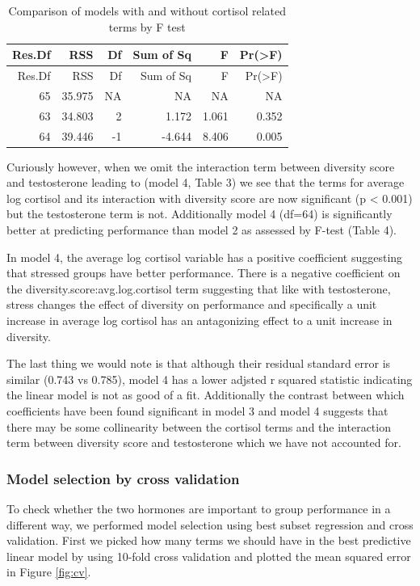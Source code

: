 \documentclass[]{article}
\begin{document}
\begin{longtable}[]{@{}rrrrrr@{}}
\caption{Comparison of models with and without cortisol related terms by
F test}\tabularnewline
\toprule
Res.Df & RSS & Df & Sum of Sq & F & Pr(\textgreater{}F)\tabularnewline
\midrule
\endfirsthead
\toprule
Res.Df & RSS & Df & Sum of Sq & F & Pr(\textgreater{}F)\tabularnewline
\midrule
\endhead
65 & 35.975 & NA & NA & NA & NA\tabularnewline
63 & 34.803 & 2 & 1.172 & 1.061 & 0.352\tabularnewline
64 & 39.446 & -1 & -4.644 & 8.406 & 0.005\tabularnewline
\bottomrule
\end{longtable}

Curiously however, when we omit the interaction term between diversity
score and testosterone leading to (model 4, Table 3) we see that the
terms for average log cortisol and its interaction with diversity score
are now significant (p \textless{} 0.001) but the testosterone term is
not. Additionally model 4 (df=64) is significantly better at predicting
performance than model 2 as assessed by F-test (Table 4).

In model 4, the average log cortisol variable has a positive coefficient
suggesting that stressed groups have better performance. There is a
negative coefficient on the diversity.score:avg.log.cortisol term
suggesting that like with testosterone, stress changes the effect of
diversity on performance and specifically a unit increase in average log
cortisol has an antagonizing effect to a unit increase in diversity.

The last thing we would note is that although their residual standard
error is similar (0.743 vs 0.785), model 4 has a lower adjsted r squared
statistic indicating the linear model is not as good of a fit.
Additionally the contrast between which coefficients have been found
significant in model 3 and model 4 suggests that there may be some
collinearity between the cortisol terms and the interaction term between
diversity score and testosterone which we have not accounted for.

\hypertarget{model-selection-by-cross-validation}{%
\subsubsection{Model selection by cross
validation}\label{model-selection-by-cross-validation}}

To check whether the two hormones are important to group performance in
a different way, we performed model selection using best subset
regression and cross validation. First we picked how many terms we
should have in the best predictive linear model by using 10-fold cross
validation and plotted the mean squared error in Figure \ref{fig:cv}.
\end{document}
